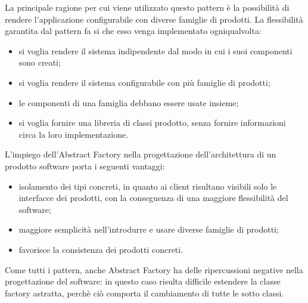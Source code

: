 La principale ragione per cui viene utilizzato questo pattern è la possibilità di rendere l'applicazione configurabile con diverse famiglie di prodotti. La flessibilità garantita dal pattern fa si che esso venga implementato ogniqualvolta:
\begin{itemize}
\item si voglia rendere il sistema indipendente dal modo in cui i suoi componenti sono creati;
\item si voglia rendere il sistema configurabile con più famiglie di prodotti;
\item le componenti di una famiglia debbano essere usate insieme;
\item si voglia fornire una libreria di classi prodotto, senza fornire informazioni circa la loro implementazione.
\end{itemize}
L'impiego dell'Abstract Factory nella progettazione dell'architettura di un prodotto software porta i seguenti vantaggi:
\begin{itemize}
\item isolamento dei tipi concreti, in quanto ai client risultano visibili solo le interfacce dei prodotti, con la conseguenza di una maggiore flessibilità del software;
\item maggiore semplicità nell'introdurre e usare diverse famiglie di prodotti;
\item favorisce la consistenza dei prodotti concreti.
\end{itemize}
Come tutti i pattern, anche Abstract Factory ha delle ripercussioni negative nella progettazione del software: in questo caso risulta difficile estendere la classe factory astratta, perchè ciò comporta il cambiamento di tutte le sotto classi.

